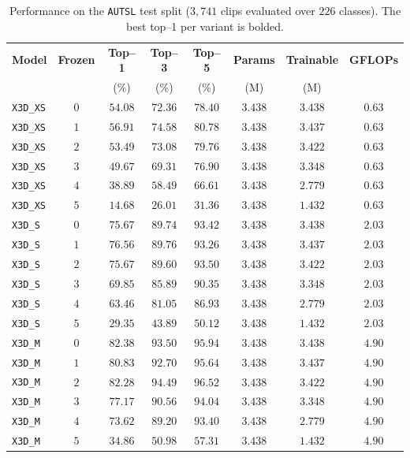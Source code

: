 \begin{table}[H]
\centering\small
\begin{tabular}{@{}l c c c c c c c@{}}
\toprule
\textbf{Model} & \textbf{Frozen} & \textbf{Top--1} & \textbf{Top--3} & \textbf{Top--5} & \textbf{Params} & \textbf{Trainable} & \textbf{GFLOPs} \\
 & & (\%) & (\%) & (\%) & (M) & (M) & \\
\midrule
\texttt{X3D\_XS} & $0$ & $54.08$ & $72.36$ & $78.40$ & $3.438$ & $3.438$ & $0.63$ \\
\texttt{X3D\_XS} & $1$ & $\mathbf{56.91}$ & $74.58$ & $80.78$ & $3.438$ & $3.437$ & $0.63$ \\
\texttt{X3D\_XS} & $2$ & $53.49$ & $73.08$ & $79.76$ & $3.438$ & $3.422$ & $0.63$ \\
\texttt{X3D\_XS} & $3$ & $49.67$ & $69.31$ & $76.90$ & $3.438$ & $3.348$ & $0.63$ \\
\texttt{X3D\_XS} & $4$ & $38.89$ & $58.49$ & $66.61$ & $3.438$ & $2.779$ & $0.63$ \\
\texttt{X3D\_XS} & $5$ & $14.68$ & $26.01$ & $31.36$ & $3.438$ & $1.432$ & $0.63$ \\
\midrule
\texttt{X3D\_S} & $0$ & $75.67$ & $89.74$ & $93.42$ & $3.438$ & $3.438$ & $2.03$ \\
\texttt{X3D\_S} & $1$ & $\mathbf{76.56}$ & $89.76$ & $93.26$ & $3.438$ & $3.437$ & $2.03$ \\
\texttt{X3D\_S} & $2$ & $75.67$ & $89.60$ & $93.50$ & $3.438$ & $3.422$ & $2.03$ \\
\texttt{X3D\_S} & $3$ & $69.85$ & $85.89$ & $90.35$ & $3.438$ & $3.348$ & $2.03$ \\
\texttt{X3D\_S} & $4$ & $63.46$ & $81.05$ & $86.93$ & $3.438$ & $2.779$ & $2.03$ \\
\texttt{X3D\_S} & $5$ & $29.35$ & $43.89$ & $50.12$ & $3.438$ & $1.432$ & $2.03$ \\
\midrule
\texttt{X3D\_M} & $0$ & $\mathbf{82.38}$ & $93.50$ & $95.94$ & $3.438$ & $3.438$ & $4.90$ \\
\texttt{X3D\_M} & $1$ & $80.83$ & $92.70$ & $95.64$ & $3.438$ & $3.437$ & $4.90$ \\
\texttt{X3D\_M} & $2$ & $82.28$ & $94.49$ & $96.52$ & $3.438$ & $3.422$ & $4.90$ \\
\texttt{X3D\_M} & $3$ & $77.17$ & $90.56$ & $94.04$ & $3.438$ & $3.348$ & $4.90$ \\
\texttt{X3D\_M} & $4$ & $73.62$ & $89.20$ & $93.40$ & $3.438$ & $2.779$ & $4.90$ \\
\texttt{X3D\_M} & $5$ & $34.86$ & $50.98$ & $57.31$ & $3.438$ & $1.432$ & $4.90$ \\
\bottomrule
\end{tabular}
\caption{Performance on the \texttt{AUTSL} test split ($3{,}741$ clips evaluated over $226$ classes). The best top–1 per variant is bolded.}
\label{tab:main_results}
\end{table}

